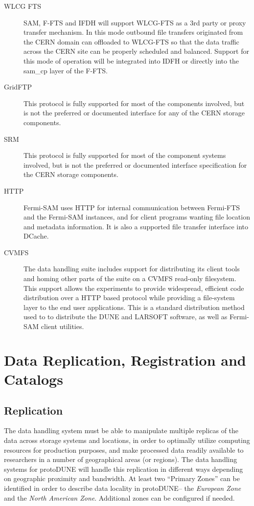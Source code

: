 \documentclass[12pt]{article}
\newcommand{\pd}{protoDUNE\xspace}
\begin{document}
{\begin{description}
\item[WLCG FTS] SAM, F-FTS and IFDH will support WLCG-FTS as a 3rd party or proxy transfer mechanism.
 In this mode outbound file transfers originated from the CERN domain can offloaded to WLCG-FTS so that the
data traffic across the CERN site can be properly scheduled and balanced.  Support for this mode of operation
will be integrated into IDFH or directly into the sam\_cp layer of the F-FTS. 

\item[GridFTP] This protocol is fully supported for most of the components involved, but is not the preferred or
documented interface for any of the CERN storage components.

\item[SRM] This protocol is fully supported for most of the component systems involved, but is not the preferred
or documented interface specification for the CERN storage components.

\item[HTTP] Fermi-SAM uses HTTP for internal communication between Fermi-FTS and the Fermi-SAM instances,
and for client programs wanting file location and metadata information. It is also a supported file transfer interface
into DCache.

\item[CVMFS] The data handling suite includes support for distributing its client tools and homing other parts of
the suite on a CVMFS read-only filesystem.  This support allows the experiments to provide widespread,
efficient code distribution over a HTTP based protocol while providing a file-system layer to the end user
applications.  This is a standard distribution method used to to distribute the DUNE and LARSOFT software,
as well as Fermi-SAM client utilities. 
\end{description}

\section{Data Replication, Registration and Catalogs}
\subsection{Replication}
\label{sec:replication}
The data handling system must be able to manipulate multiple replicas of the data across storage systems and locations, in order
to optimally utilize computing resources for production purposes, and make processed data readily available to researchers in
a number of geographical areas (or regions).
The data handling systems for \pd will handle this replication in different ways
depending on geographic proximity and bandwidth.  At least two ``Primary Zones'' can be identified in order
to describe data locality in \pd -- the \textit{European Zone} and the \textit{North American Zone}.
Additional zones can be configured if needed.

}
\end{document}
